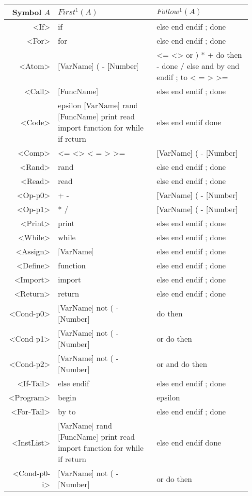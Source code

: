 \begin{longtable}{r p{7cm} p{7cm}}
\textnormal{Symbol} $A$ & $First^1(A)$ & $Follow^1(A)$\\ \hline
<If> & if  & else end endif ; done \\ \hline
<For> & for  & else end endif ; done \\ \hline
<Atom> & [VarName] ( - [Number]  & <= <> or ) * + do then - done / else and by end endif ; to < = > >= \\ \hline
<Call> & [FuncName]  & else end endif ; done \\ \hline
<Code> & epsilon [VarName] rand [FuncName] print read import function for while if return  & else end endif done \\ \hline
<Comp> & <= <> < = > >=  & [VarName] ( - [Number] \\ \hline
<Rand> & rand  & else end endif ; done \\ \hline
<Read> & read  & else end endif ; done \\ \hline
<Op-p0> & + -  & [VarName] ( - [Number] \\ \hline
<Op-p1> & * /  & [VarName] ( - [Number] \\ \hline
<Print> & print  & else end endif ; done \\ \hline
<While> & while  & else end endif ; done \\ \hline
<Assign> & [VarName]  & else end endif ; done \\ \hline
<Define> & function  & else end endif ; done \\ \hline
<Import> & import  & else end endif ; done \\ \hline
<Return> & return  & else end endif ; done \\ \hline
<Cond-p0> & [VarName] not ( - [Number]  & do then \\ \hline
<Cond-p1> & [VarName] not ( - [Number]  & or do then \\ \hline
<Cond-p2> & [VarName] not ( - [Number]  & or and do then \\ \hline
<If-Tail> & else endif  & else end endif ; done \\ \hline
<Program> & begin  & epsilon \\ \hline
<For-Tail> & by to  & else end endif ; done \\ \hline
<InstList> & [VarName] rand [FuncName] print read import function for while if return  & else end endif done \\ \hline
<Cond-p0-i> & [VarName] not ( - [Number]  & or do then \\ \hline

\end{longtable}
